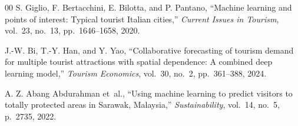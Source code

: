 \documentclass[conference]{IEEEtran}
\begin{document}
\begin{thebibliography}{00}
S. Giglio, F. Bertacchini, E. Bilotta, and P. Pantano,
``Machine learning and points of interest: Typical tourist Italian cities,''
\textit{Current Issues in Tourism}, vol.~23, no.~13, pp.~1646--1658, 2020.

J.-W. Bi, T.-Y. Han, and Y. Yao,
``Collaborative forecasting of tourism demand for multiple tourist attractions
with spatial dependence: A combined deep learning model,''
\textit{Tourism Economics}, vol.~30, no.~2, pp.~361--388, 2024.

A. Z. Abang Abdurahman et~al.,
``Using machine learning to predict visitors to totally protected areas
in Sarawak, Malaysia,''
\textit{Sustainability}, vol.~14, no.~5, p.~2735, 2022.

\end{thebibliography}
\end{document}
